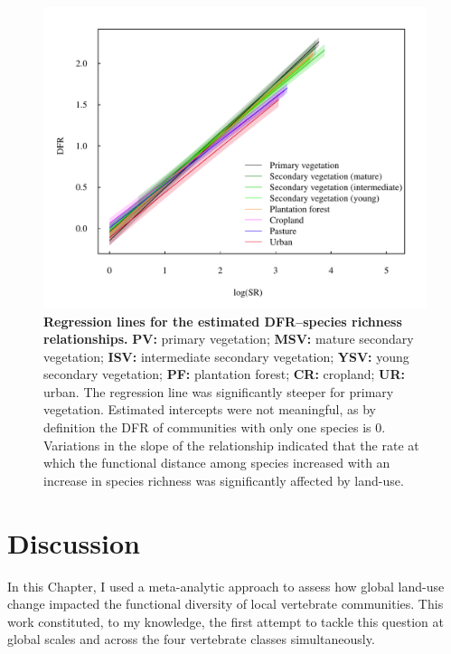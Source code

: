 \begin{figure}[h!]
\centering
\includegraphics[scale=0.70]{figures/chapter3/DFR/regression_lines}
\caption[Regression lines for the estimated DFR--species richness relationships]{\textbf{Regression lines for the estimated DFR--species richness relationships.} \textbf{PV:} primary vegetation; \textbf{MSV:} mature secondary vegetation; \textbf{ISV:} intermediate secondary vegetation; \textbf{YSV:} young secondary vegetation; \textbf{PF:} plantation forest; \textbf{CR:} cropland; \textbf{UR:} urban. The regression line was significantly steeper for primary vegetation. Estimated intercepts were not meaningful, as by definition the DFR of communities with only one species is 0. Variations in the slope of the relationship indicated that the rate at which the functional distance among species increased with an increase in species richness was significantly affected by land-use.}
\label{reglines}
\end{figure}

\pagebreak
\section{Discussion}

In this Chapter, I used a meta-analytic approach to assess how global land-use change impacted the functional diversity of local vertebrate communities. This work constituted, to my knowledge, the first attempt to tackle this question at global scales and across the four vertebrate classes simultaneously. 

